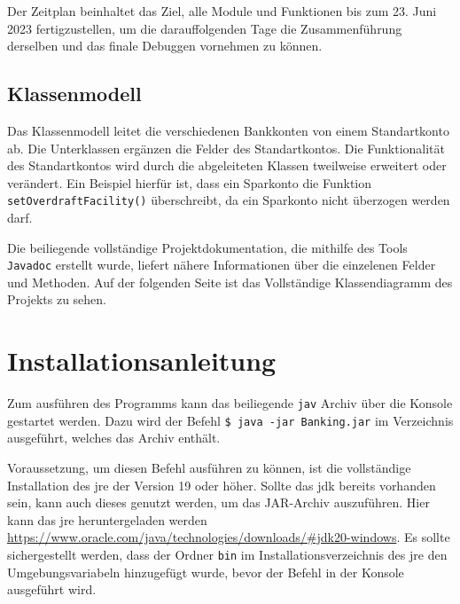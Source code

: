 \documentclass[
	12pt,
	a4paper,
	hidelinks
	]{report}
\newcommand{\code}[1]{\texttt{#1}}
\begin{document}
Der Zeitplan beinhaltet das Ziel, alle Module und Funktionen bis zum 23. Juni 2023 fertigzustellen, um die darauffolgenden Tage die Zusammenführung derselben und das finale Debuggen vornehmen zu können.

\subsection{Klassenmodell}
\begin{figure}[!h]
\end{figure}
Das Klassenmodell leitet die verschiedenen Bankkonten von einem Standartkonto ab. Die Unterklassen ergänzen die Felder des Standartkontos. Die Funktionalität des Standartkontos wird durch die abgeleiteten Klassen tweilweise erweitert oder verändert. Ein Beispiel hierfür ist, dass ein Sparkonto die Funktion \code{setOverdraftFacility()} überschreibt, da ein Sparkonto nicht überzogen werden darf.

Die beiliegende vollständige Projektdokumentation, die mithilfe des Tools \code{Javadoc} erstellt wurde, liefert nähere Informationen über die einzelenen Felder und Methoden. Auf der folgenden Seite ist das Vollständige Klassendiagramm des Projekts zu sehen.



\section{Installationsanleitung}
Zum ausführen des Programms kann das beiliegende \code{jav} Archiv über die Konsole gestartet werden. Dazu wird der Befehl \code{\$ java -jar Banking.jar} im Verzeichnis ausgeführt, welches das Archiv enthält.

Voraussetzung, um diesen Befehl ausführen zu können, ist die vollständige Installation des \ac{jre} der Version 19 oder höher. Sollte das \ac{jdk} bereits vorhanden sein, kann auch dieses genutzt werden, um das JAR-Archiv auszuführen. Hier kann das \ac{jre} heruntergeladen werden \url{https://www.oracle.com/java/technologies/downloads/#jdk20-windows}. Es sollte sichergestellt werden, dass der Ordner \code{bin} im Installationsverzeichnis des \ac{jre} den Umgebungsvariabeln hinzugefügt wurde, bevor der Befehl in der Konsole ausgeführt wird.
\end{document}
